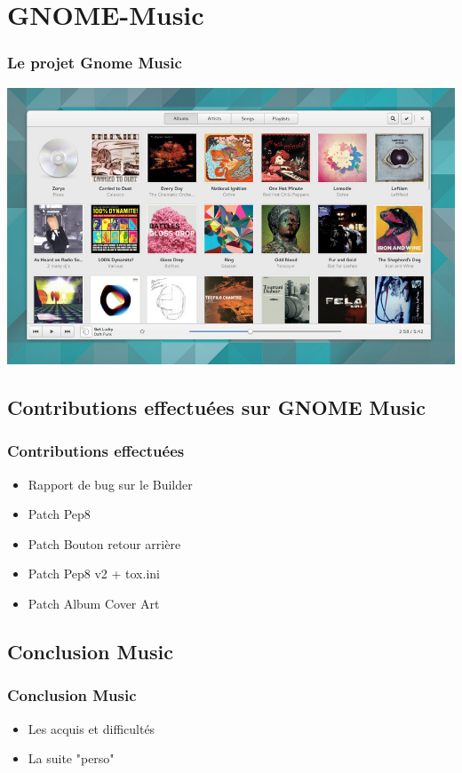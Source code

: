 \documentclass{beamer}
\begin{document}
\section{GNOME-Music}
\begin{frame}
  \frametitle{Le projet Gnome Music}
  \includegraphics[scale=0.325]{images/gnome-music-app.png}
\end{frame}

\subsection{Contributions effectuées sur GNOME Music}
\begin{frame}
  \frametitle{Contributions effectuées}
  \begin{itemize}
  \item Rapport de bug sur le Builder
  \item Patch Pep8
  \item Patch Bouton retour arrière
  \item Patch Pep8 v2 + tox.ini
  \item Patch Album Cover Art
  
  \end{itemize}
\end{frame}

\subsection{Conclusion Music}
\begin{frame}
  \frametitle{Conclusion Music}
  \begin{itemize}
  \item Les acquis et difficultés
  \item La suite "perso"
  \end{itemize}
\end{frame}
\end{document}
